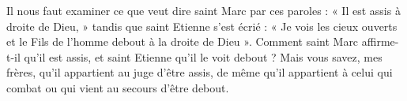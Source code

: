 Il nous faut examiner ce que veut dire saint Marc par ces paroles : « Il est assis à droite de Dieu, » tandis que saint Etienne s’est écrié : « Je vois les cieux ouverts et le Fils de l’homme debout à la droite de Dieu ». Comment saint Marc affirme-t-il qu’il est assis, et saint Etienne qu’il le voit debout ? Mais vous savez, mes frères, qu’il appartient au juge d’être assis, de même qu’il appartient à celui qui combat ou qui vient au secours d’être debout.